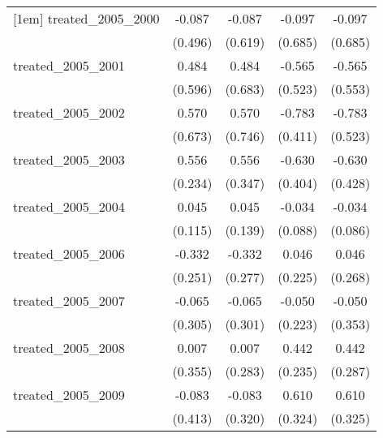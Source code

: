 {\begin{tabular}{l*{4}{c}}
[1em]
treated\_2005\_2000&      -0.087         &      -0.087         &      -0.097         &      -0.097         \\
            &     (0.496)         &     (0.619)         &     (0.685)         &     (0.685)         \\
[1em]
treated\_2005\_2001&       0.484         &       0.484         &      -0.565         &      -0.565         \\
            &     (0.596)         &     (0.683)         &     (0.523)         &     (0.553)         \\
[1em]
treated\_2005\_2002&       0.570         &       0.570         &      -0.783         &      -0.783         \\
            &     (0.673)         &     (0.746)         &     (0.411)         &     (0.523)         \\
[1em]
treated\_2005\_2003&       0.556\sym{*}  &       0.556         &      -0.630         &      -0.630         \\
            &     (0.234)         &     (0.347)         &     (0.404)         &     (0.428)         \\
[1em]
treated\_2005\_2004&       0.045         &       0.045         &      -0.034         &      -0.034         \\
            &     (0.115)         &     (0.139)         &     (0.088)         &     (0.086)         \\
[1em]
treated\_2005\_2006&      -0.332         &      -0.332         &       0.046         &       0.046         \\
            &     (0.251)         &     (0.277)         &     (0.225)         &     (0.268)         \\
[1em]
treated\_2005\_2007&      -0.065         &      -0.065         &      -0.050         &      -0.050         \\
            &     (0.305)         &     (0.301)         &     (0.223)         &     (0.353)         \\
[1em]
treated\_2005\_2008&       0.007         &       0.007         &       0.442         &       0.442         \\
            &     (0.355)         &     (0.283)         &     (0.235)         &     (0.287)         \\
[1em]
treated\_2005\_2009&      -0.083         &      -0.083         &       0.610         &       0.610         \\
            &     (0.413)         &     (0.320)         &     (0.324)         &     (0.325)         \\

\end{tabular}}
